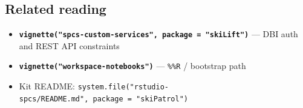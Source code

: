 \documentclass[
]{article}
\providecommand{\tightlist}{%
  \setlength{\itemsep}{0pt}\setlength{\parskip}{0pt}}
\begin{document}
\subsection{Related reading}\label{related-reading}

\begin{itemize}
\tightlist
\item
  \textbf{\texttt{vignette("spcs-custom-services",\ package\ =\ "skiLift")}}
  --- DBI auth and REST API constraints
\item
  \textbf{\texttt{vignette("workspace-notebooks")}} --- \texttt{\%\%R} /
  bootstrap path
\item
  Kit README:
  \texttt{system.file("rstudio-spcs/README.md",\ package\ =\ "skiPatrol")}
\end{itemize}
\end{document}
